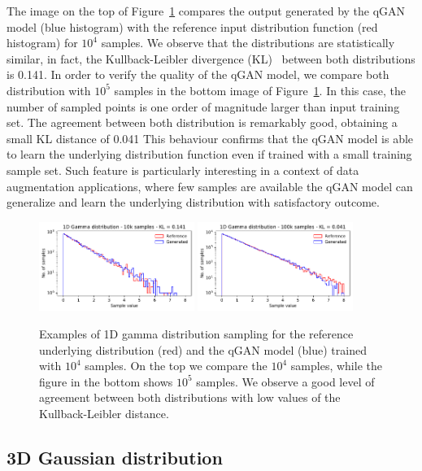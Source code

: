 \documentclass[twocolumn,preprintnumbers,superscriptaddress]{revtex4-2}
\begin{document}
The image on the top of Figure~\ref{fig:gamma} compares the output generated by
the qGAN model (blue histogram) with the reference input distribution function
(red histogram) for $10^4$ samples. We observe that the distributions are
statistically similar, in fact, the Kullback-Leibler divergence
(KL)~\cite{kullback1951information} between both distributions is 0.141.
%
In order to verify the quality of the qGAN model, we compare both distribution
with $10^5$ samples in the bottom image of Figure~\ref{fig:gamma}. In this case,
the number of sampled points is one order of magnitude larger than input
training set. The agreement between both distribution is remarkably good,
obtaining a small KL distance of 0.041
%
This behaviour confirms that the qGAN model is able to learn the underlying
distribution function even if trained with a small training sample set. Such
feature is particularly interesting in a context of data augmentation
applications, where few samples are available the qGAN model can generalize and
learn the underlying distribution with satisfactory outcome.

\begin{figure}
  \includegraphics[width=0.45\textwidth]{plots/1Dgamma/1Dgamma_distribution_10k.pdf}
  \includegraphics[width=0.45\textwidth]{plots/1Dgamma/1Dgamma_distribution_100k.pdf}
  \caption{\label{fig:gamma} Examples of 1D gamma distribution sampling for the
  reference underlying distribution (red) and the qGAN model (blue) trained with
  $10^4$ samples. On the top we compare the $10^4$ samples, while the figure in
  the bottom shows $10^5$ samples. We observe a good level of agreement between
  both distributions with low values of the Kullback-Leibler distance.}
\end{figure}

\subsection{3D Gaussian distribution}
\end{document}
